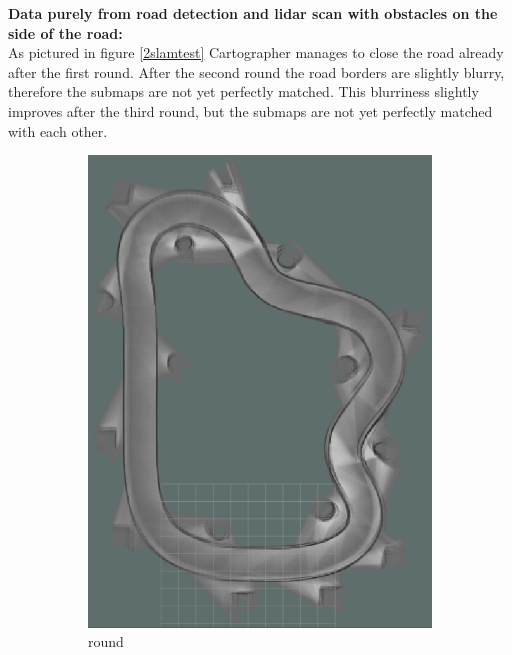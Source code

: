 \textbf{Data purely from road detection and lidar scan with obstacles on the side of the road:}\\


As pictured in figure \ref{2slamtest} Cartographer manages to close the road already after the first round. After the second round the road borders are slightly blurry, therefore the submaps are not yet perfectly matched. This blurriness slightly improves after the third round, but the submaps are not yet perfectly matched with each other.

\begin{figure}[H]
	\centering
	\begin{subfigure}{.3\linewidth}
		\includegraphics[width=\textwidth]{Pictures/2slamtest1}
		\caption{ round}
		\end{subfigure}	
	\begin{subfigure}{.3\linewidth}

\end{subfigure}
\end{figure}
